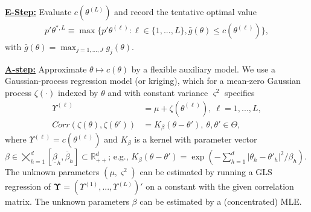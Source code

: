 \documentclass[letterpaper,11pt]{article}
\theoremstyle{myplain}
\theoremstyle{mydefinition}
\theoremstyle{myremark}
\newcommand{\R}{\mathbb{R}}
\numberwithin{equation}{section}
\numberwithin{figure}{section}
\begin{document}
\noindent\underline{\textbf{E-Step:}} Evaluate $c(\theta^{(L)})$ and record the tentative optimal value
\begin{align}
p'\theta^{*,L}\equiv\max\bigl\{p'\theta^{(\ell)}:\ell \in\{1,..., L\}, \bar g(\theta)\le c(\theta^{(\ell)})\bigr\},\label{eq:E_step_max}
\end{align}
with $\bar g(\theta)=\max_{j=1,...,J}g_j(\theta)$. 
		\medskip

\noindent\underline{\textbf{A-step:}} Approximate $\theta\mapsto c(\theta)$ by a flexible auxiliary model. We use a Gaussian-process regression model (or kriging), which for a mean-zero Gaussian process $\zeta(\cdot)$ indexed by $\theta$ and with constant variance $\varsigma^2$ specifies
	\begin{align}
		\Upsilon^{(\ell)}&=\mu+\zeta(\theta^{(\ell)}), ~\ell=1,..., L,\label{eq:EAM:gauss_prior}\\
		Corr(\zeta(\theta),\zeta(\theta'))&=K_\beta(\theta-\theta'),~ \theta,\theta' \in \Theta\label{eq:EAM:corr},
	\end{align}
	where $\Upsilon^{(\ell)}=c(\theta^{(\ell)})$ and $K_\beta$ is a kernel with parameter vector $\beta \in \bigtimes_{h=1}^d[\underline{\beta}_h,\overline{\beta}_h]\subset \R^d_{++}$; e.g., $K_\beta(\theta-\theta')=\exp(-\sum_{h=1}^d|\theta_h-\theta'_h|^{2}/\beta_h)$. The unknown parameters $(\mu,\varsigma^2)$ can be estimated by running a GLS regression of $\mathbf\Upsilon=(\Upsilon^{(1)},...,\Upsilon^{(L)})'$ on a constant with the given correlation matrix. The unknown parameters $\beta$ can be estimated by a (concentrated) MLE.
\end{document}
